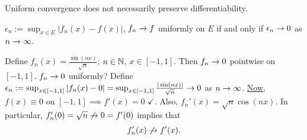 \documentclass[]{article}
\begin{document}
\begin{note}
	Uniform convergence does not necessarily preserve differentiability.
\end{note}
\begin{recall}
	$\epsilon_n := \sup_{x\in E} |f_n(x)-f(x)|$, $f_n\rightarrow f$ uniformly on $E$ if and only if $\epsilon_n\rightarrow 0$ as $n\rightarrow\infty$.
\end{recall}
\begin{example}
	Define $f_n(x) = \frac{\sin(nx)}{\sqrt n}$; $n\in\mathbb{N}$, $x\in[-1,1]$.
	Then $f_n\rightarrow 0$ pointwise on $[-1,1]$.
	$f_n\rightarrow 0$ uniformly? Define $\epsilon_n:= \sup_{x\in[-1,1]} |f_n(x)-0| = \sup_{x\in[-1,1]} \frac{|\sin(nx)|}{\sqrt n} \rightarrow 0$ as $n\rightarrow\infty$.
	\ul{Now}, $f(x)\equiv 0$ on $[-1,1] \implies f'(x)=0$ $\checkmark$.
	Also, $f_n'(x) = \sqrt n\cos(nx)$.
	In particular, $f_n'(0) = \sqrt n\not\rightarrow0=f'(0)$ implies that $$f_n'(x)\not\rightarrow f'(x).$$
\end{example}
\end{document}
